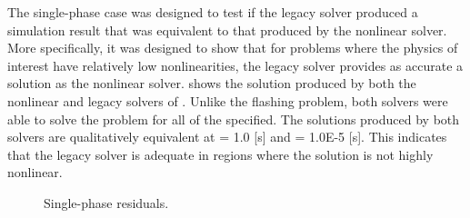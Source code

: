 The single-phase case was designed to test if the legacy solver produced a simulation result that was equivalent to that produced by the nonlinear solver.
More specifically, it was designed to show that for problems where the physics of interest have relatively low nonlinearities, the legacy solver provides as accurate a solution as the nonlinear solver.
 shows the solution produced by both the nonlinear and legacy solvers of \cobra{}.
Unlike the flashing problem, both solvers were able to solve the problem for all of the \dtmax{} specified.
The solutions produced by both solvers are qualitatively equivalent at \dtmax{} = 1.0 [s] and \dtmax{} = 1.0E-5 [s].
This indicates that the legacy solver is adequate in regions where the solution is not highly nonlinear.

\begin{figure}[h!t]
\centering
{}
\caption[Single-phase residuals.]{Single-phase residuals.}
\label{fig:single_compare_2}
\end{figure}

